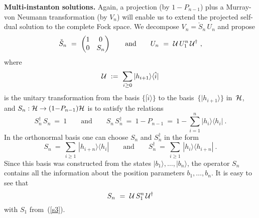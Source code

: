 \documentclass[a4paper,11pt]{article}
\numberwithin{equation}{section}
\newcommand{\Hcal}{{\cal H}}
\newcommand{\U}{{\cal U}}
\def\>{\rangle}
\def\<{\langle}
\def\+{\dagger}
\begin{document}
{\noindent
{\bf Multi-instanton solutions.}
Again, a projection (by $1{-}P_{n-1}$) plus a Murray-von Neumann 
transformation (by $V_n$) will enable us to extend the projected self-dual 
solution to the complete Fock space. 
We decompose $V_n=\check S_n\,U_n$ and propose
\begin{equation}\label{gauge5}
\check S_n\ =\ \begin{pmatrix}1&0\\0&S_n\end{pmatrix} 
\qquad\textrm{and}\qquad
U_n\ =\ \U\,U_1^n\,{\U}^\+ \ ,
\end{equation}
where
\begin{equation}
\U\ :=\ \sum_{i\ge0} |h_{i+1}\>\<\hat{i}|
\end{equation}
is the unitary transformation from the basis $\{|\hat{i}\>\}$ to the 
basis~$\{|h_{i+1}\>\}$ in~$\Hcal$, 
and $S_n: \Hcal\to(1{-}P_{n-1})\Hcal$ is to satisfy the relations
\begin{equation} \label{Sn}
S^\+_{n}\,S_{n}\ =\ 1 \qquad\textrm{and}\qquad
S_{n}\,S^\+_{n}\ =\ 1-P_{n-1}\ =\ 1-\sum_{i=1}^n |h_i\>\<h_i|\ .
\end{equation}
In the orthonormal basis one can choose $S_n$ and $S^\+_n$ in the form
\begin{equation}
S_{n}\ =\ \sum_{i\ge 1}\,|h_{i+n}\>\<h_i|\qquad\textrm{and}\qquad
S^\+_{n}\ =\ \sum_{i\ge 1}\,|h_{i}\>\<h_{i+n}|\ .
\end{equation}
Since this basis was constructed from the states $|b_1\>,\ldots,|b_n\>$,
the operator $S_n$ contains all the information about the position parameters 
$b_1,\ldots,b_n$.
It is easy to see that
\begin{equation}
S_n\ =\ \U\,S_1^n\,{\U}^\+
\end{equation}
with $S_1$ from~(\ref{s3}).

}
\end{document}
